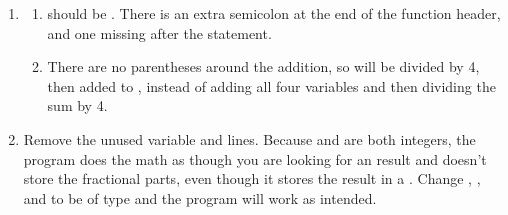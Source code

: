 \begin{enumerate}
	\item 
	\begin{enumerate}
		\item {} should be . 
		There is an extra semicolon at the end of the function header, and one missing after the  statement.
		\item There are no parentheses around the addition, so  will be divided by 4, then added to , instead of adding all four variables and then dividing the sum by 4.
	\end{enumerate}
	
	\item Remove the unused variable  and  lines.
Because  and  are both integers, the program does the math as though you are looking for an  result and doesn't store the fractional parts, even though it stores the result in a . Change , , and  to be of type  and the program will work as intended.

\end{enumerate}



